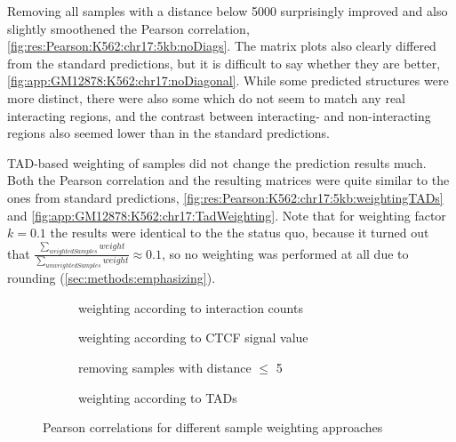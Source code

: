 Removing all samples with a distance below \SI{5000}{\bp} surprisingly improved and also slightly smoothened the Pearson correlation, 
\autoref{fig:res:Pearson:K562:chr17:5kb:noDiags}.
The matrix plots also clearly differed from the standard predictions, but it is difficult to say whether they are better,
\autoref{fig:app:GM12878:K562:chr17:noDiagonal}.
While some predicted structures were more distinct, there were also some which do not seem to match any real interacting regions, 
and the contrast between interacting- and non-interacting regions also seemed lower than in the standard predictions.

TAD-based weighting of samples did not change the prediction results much.
Both the Pearson correlation and the resulting matrices were quite similar to the ones from standard predictions,
\autoref{fig:res:Pearson:K562:chr17:5kb:weightingTADs} and \ref{fig:app:GM12878:K562:chr17:TadWeighting}.
Note that for weighting factor $k=0.1$ the results were identical to the the status quo,
because it turned out that $\frac{\sum_{weightedSamples}weight}{\sum_{unweightedSamples}weight}\approx 0.1$, so no weighting was performed at all
due to rounding (\autoref{sec:methods:emphasizing}).


\begin{figure}
\centering
\begin{subfigure}{.495\textwidth}
  \centering
 \caption{weighting according to interaction counts}
 \label{fig:res:Pearson:K562:chr17:5kb:weightingInteractionCts}
\end{subfigure}\hfill%
\begin{subfigure}{.495\textwidth}
  \centering
 \caption{weighting according to CTCF signal value}
 \label{fig:res:Pearson:K562:chr17:5kb:weightingCTCF}
\end{subfigure}

\vspace{5mm}
\begin{subfigure}{.495\textwidth}
  \centering
 \caption{removing samples with distance $\leq$ \SI{5}{\kilo\bp}}
 \label{fig:res:Pearson:K562:chr17:5kb:noDiags}
\end{subfigure}
\begin{subfigure}{.495\textwidth}
  \centering
 \caption{weighting according to TADs}
 \label{fig:res:Pearson:K562:chr17:5kb:weightingTADs}
\end{subfigure}
\caption{Pearson correlations for different sample weighting approaches}
\label{fig:res:Pearson:sampleWeighting:5k}
\end{figure}

